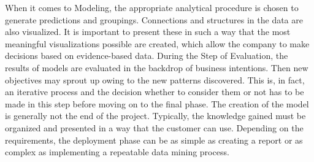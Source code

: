When it comes to Modeling, the appropriate analytical procedure is chosen to generate predictions and groupings. Connections and structures in the data are also visualized. 
It is important to present these in such a way that the most meaningful visualizations possible are created, which allow the company to make decisions based on evidence-based data.
During the Step of Evaluation, the results of models are evaluated in the backdrop of business intentions. 
Then new objectives may sprout up owing to the new patterns discovered. This is, in fact, an iterative process and the decision whether to consider them or not has 
to be made in this step before moving on to the final phase. 
The creation of the model is generally not the end of the project. Typically, the knowledge gained must be organized and presented in a way that the customer can use. 
Depending on the requirements, the deployment phase can be as simple as creating a report or as complex as implementing a repeatable data mining process. 